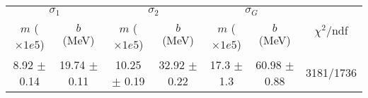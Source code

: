 \begin{tabular}{cc|cc|cc||c}
\multicolumn{2}{c|}{$\sigma_1$} & \multicolumn{2}{|c}{$\sigma_2$} & \multicolumn{2}{|c}{$\sigma_G$}  & \multirow{2}{*}{$\chi^2/$ndf}\\
$m$ ($\times1e5$) & $b$ (MeV) & $m$ ($\times1e5$) & $b$ (MeV) & $m$ ($\times1e5$) & $b$ (MeV) & \\
\hline
8.92 $\pm$ 0.14 & 19.74 $\pm$ 0.11 & 10.25 $\pm$ 0.19 & 32.92 $\pm$ 0.22 & 17.3 $\pm$ 1.3 & 60.98 $\pm$ 0.88 & 3181/1736\\
\end{tabular}

